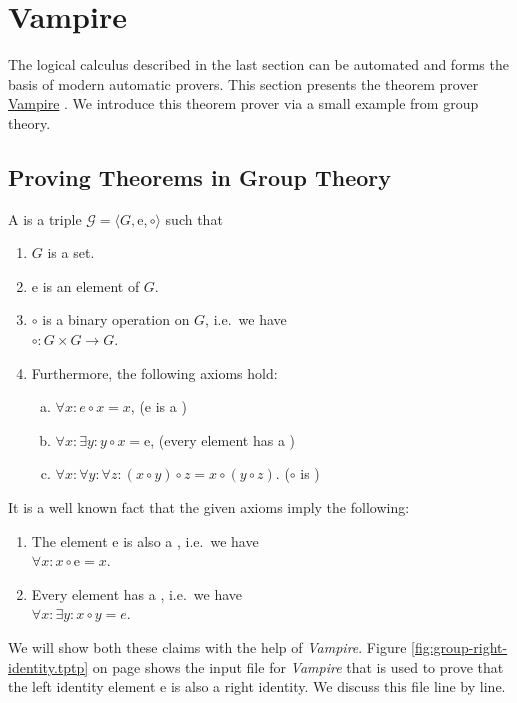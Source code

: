 \section{Vampire }
The logical calculus described in the last section can be automated and forms the basis of modern
automatic provers.  This section presents the theorem prover \href{https://vprover.github.io}{Vampire}
\cite{kovacs:2013}.  We introduce this theorem prover via a small example from group theory.

\subsection{Proving Theorems in Group Theory}
A  is a triple $\mathcal{G} = \langle G, \mathrm{e}, \circ \rangle$
such that
\begin{enumerate}
\item $G$ is a set.
\item $\mathrm{e}$ is an element of $G$.
\item $\circ$ is a binary operation on $G$, i.e.~we have
      \\[0.2cm]
      \hspace*{1.3cm}
      $\circ: G \times G \rightarrow G$.
\item Furthermore, the following axioms hold:
      \begin{enumerate}[(a)]
      \item $\forall x: e \circ x = x$, \hspace*{\fill} ($\mathrm{e}$ is a )
      \item $\forall x: \exists y: y \circ x = \mathrm{e}$, \hspace*{\fill} (every element has a ) 
      \item $\forall x: \forall y: \forall z: (x \circ y) \circ z = x \circ (y \circ z)$. \hspace*{\fill} ($\circ$ is )
      \end{enumerate}
\end{enumerate}
It is a well known fact that the given axioms imply the following:
\begin{enumerate}
\item The element $\mathrm{e}$ is also a , i.e.~we have
      \\[0.2cm]
      \hspace*{1.3cm}
      $\forall x: x \circ \mathrm{e} = x$.
\item Every element has a , i.e.~we have
      \\[0.2cm]
      \hspace*{1.3cm}
      $\forall x: \exists y: x \circ y = e$.
\end{enumerate}
We will show both these claims with the help of \textsl{Vampire}.  Figure \ref{fig:group-right-identity.tptp} on page
\pageref{fig:group-right-identity.tptp} shows the input file for \textsl{Vampire} that is used to prove that
the left identity element $\mathrm{e}$ is also a right identity.  We discuss this file line by line.

